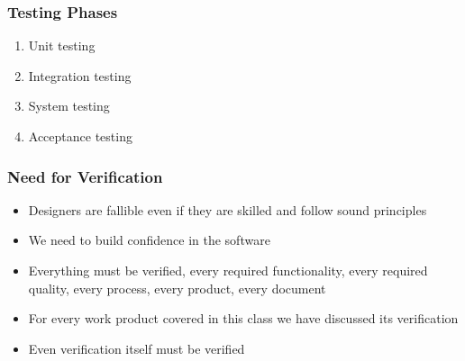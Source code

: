 \documentclass[t,12pt,numbers,fleqn]{beamer}
\begin{document}

\begin{frame}
\frametitle{Testing Phases}
\begin{enumerate}
\item Unit testing
\item Integration testing
\item System testing
\item Acceptance testing
\end{enumerate}
\end{frame}


\begin{frame}
\frametitle{Need for Verification}

\begin{itemize}

\item Designers are fallible even if they are skilled and follow sound principles
\item We need to build confidence in the software
\item Everything must be verified, every required functionality, every required
  quality, every process, every product, every document
\item For every work product covered in this class we have discussed its verification
\item Even verification itself must be verified

\end{itemize}

\end{frame}

\end{document}
